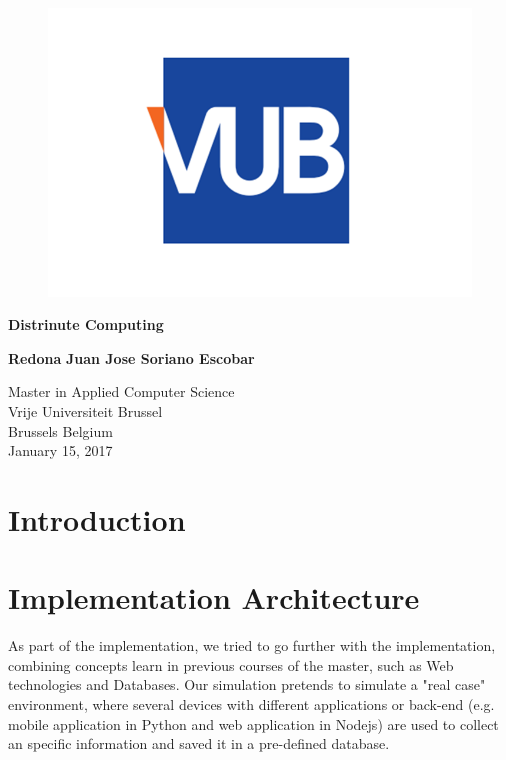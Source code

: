\documentclass{article}
\begin{document}
    \begin{titlepage}
        \begin{center}
            \vspace*{1cm}
            \begin{figure}
                \centering
                \includegraphics[width=0.5\linewidth]{./img/vub.png}
            \end{figure}
            \Huge
            \textbf{Distrinute Computing}
            
           
            
            \vspace{1.5cm}

            \textbf{Redona}
            \vspace{0.5cm}
            \textbf{Juan Jose Soriano Escobar}
            
            \vfill
            
            
            \Large
            Master in Applied Computer Science\\
            Vrije Universiteit Brussel\\
            Brussels Belgium\\
            January 15, 2017
            
        \end{center}
    \end{titlepage}

    \tableofcontents
    \newpage

    \begin{appendix}
        \listoffigures
      \end{appendix}
      \newpage


        \section{Introduction}

        \section{Implementation Architecture}
        As part of the implementation, we tried to go further with the implementation, combining concepts learn in previous courses of the master, such as Web technologies and Databases.  
        Our simulation pretends to simulate a "real case" environment, where several devices with different applications or back-end (e.g. mobile application in Python and web application in Nodejs)
        are used to collect an specific information and saved it in a pre-defined database.
\end{document}
